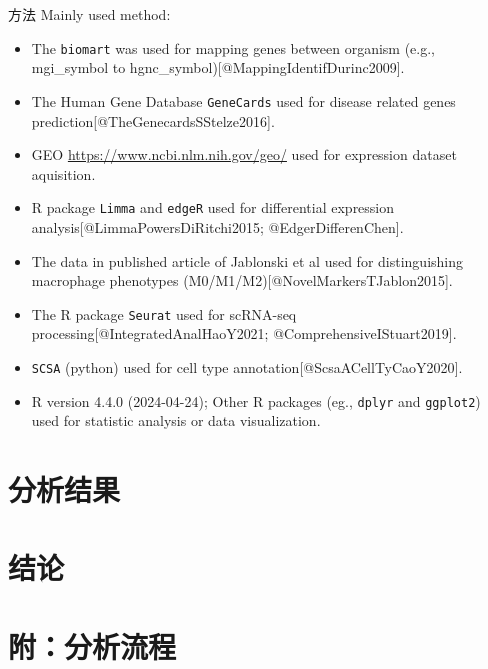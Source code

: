 \documentclass[
  ignorenonframetext,
]{beamer}
\providecommand{\tightlist}{%
  \setlength{\itemsep}{0pt}\setlength{\parskip}{0pt}}
\begin{document}
\begin{frame}[fragile]{方法}
\protect\hypertarget{ux65b9ux6cd5}{}
Mainly used method:

\begin{itemize}
\tightlist
\item
  The \texttt{biomart} was used for mapping genes between organism
  (e.g., mgi\_symbol to hgnc\_symbol){[}@MappingIdentifDurinc2009{]}.
\item
  The Human Gene Database \texttt{GeneCards} used for disease related
  genes prediction{[}@TheGenecardsSStelze2016{]}.
\item
  GEO \url{https://www.ncbi.nlm.nih.gov/geo/} used for expression
  dataset aquisition.
\item
  R package \texttt{Limma} and \texttt{edgeR} used for differential
  expression analysis{[}@LimmaPowersDiRitchi2015; @EdgerDifferenChen{]}.
\item
  The data in published article of Jablonski et al used for
  distinguishing macrophage phenotypes
  (M0/M1/M2){[}@NovelMarkersTJablon2015{]}.
\item
  The R package \texttt{Seurat} used for scRNA-seq
  processing{[}@IntegratedAnalHaoY2021; @ComprehensiveIStuart2019{]}.
\item
  \texttt{SCSA} (python) used for cell type
  annotation{[}@ScsaACellTyCaoY2020{]}.
\item
  R version 4.4.0 (2024-04-24); Other R packages (eg., \texttt{dplyr}
  and \texttt{ggplot2}) used for statistic analysis or data
  visualization.
\end{itemize}
\end{frame}

\hypertarget{results}{%
\section{分析结果}\label{results}}

\hypertarget{dis}{%
\section{结论}\label{dis}}

\hypertarget{workflow}{%
\section{附：分析流程}\label{workflow}}
\end{document}
